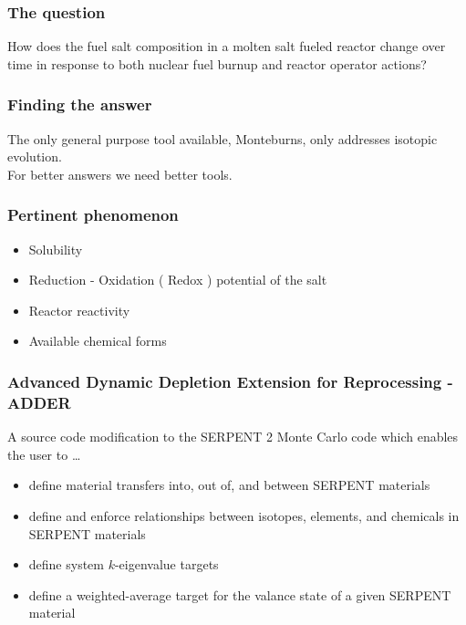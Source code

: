 \documentclass{beamer}
\begin{document}
\begin{frame}
\frametitle{The question}

How does the fuel salt composition in a molten salt fueled reactor change over
time in response to both nuclear fuel burnup and reactor operator actions?

\end{frame}

\begin{frame}
\frametitle{Finding the answer}

The only general purpose tool available, Monteburns, only addresses isotopic
evolution.
\\
For better answers we need better tools.

\end{frame}

\begin{frame}
\frametitle{Pertinent phenomenon}

    \begin{itemize}
        \item Solubility
        \item Reduction - Oxidation ( Redox ) potential of the salt
        \item Reactor reactivity
        \item Available chemical forms
    \end{itemize}

\end{frame}

\begin{frame}
\frametitle{Advanced Dynamic Depletion Extension for Reprocessing - ADDER}

A source code modification to the SERPENT 2 Monte Carlo code which enables the
user to \ldots

    \begin{itemize}
        \item define material transfers into, out of, and between SERPENT materials
        \item define and enforce relationships between isotopes, elements, and chemicals in SERPENT materials
        \item define system $k$-eigenvalue targets
        \item define a weighted-average target for the valance state of a given SERPENT material
    \end{itemize}

\end{frame}
\end{document}
